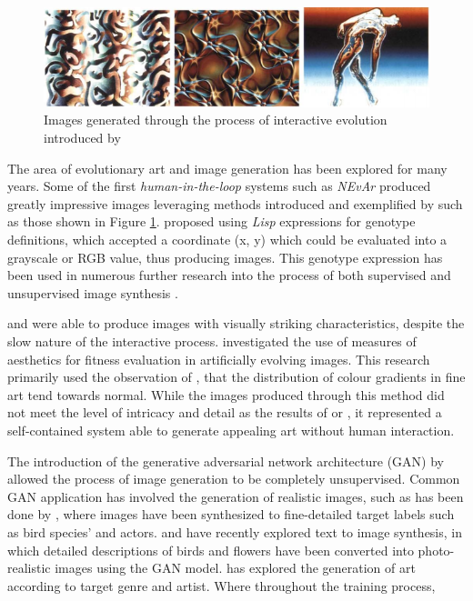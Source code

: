 \documentclass{article}
\begin{document}
	\begin{figure}[h!]
		\includegraphics[width=\textwidth]{images/sims-interactive-image-generation.png}
		\caption{Images generated through the process of interactive evolution introduced by \citet{sims}}
		\label{fig:sims}
	\end{figure}
	
	The area of evolutionary art and image generation has been explored for many years.
	Some of the first \textit{human-in-the-loop} systems such as \textit{NEvAr} \citep{nevar} produced greatly impressive images leveraging methods introduced and exemplified by \citet{sims} such as those shown in Figure \ref{fig:sims}.
	\citet{sims} proposed using \textit{Lisp} expressions for genotype definitions, which accepted a coordinate (x, y) which could be evaluated into a grayscale or RGB value, thus producing images.
	This genotype expression has been used in numerous further research into the process of both supervised and unsupervised image synthesis \citep{nevar, sims, den2011evolving, distributed-evolutionary-art, aesthetic-measures}.
	
	\citet{sims} and \citet{nevar} were able to produce images with visually striking characteristics, despite the slow nature of the interactive process.
	\citet{aesthetic-measures} investigated the use of measures of aesthetics for fitness evaluation in artificially evolving images.
	This research primarily used the observation of \citet{ralph-bell-curve}, that the distribution of colour gradients in fine art tend towards normal.
	While the images produced through this method did not meet the level of intricacy and detail as the results of \citet{sims} or \citet{nevar}, it represented a self-contained system able to generate appealing art without human interaction.
	
	The introduction of the generative adversarial network architecture (GAN) by \citet{GAN} allowed the process of image generation to be completely unsupervised.
	Common GAN application has involved the generation of realistic images, such as has been done by \citet{bao2017cvae}, where images have been synthesized to fine-detailed target labels such as bird species' and actors.
	\citet{zhang2017stackgan} and \citet{reed2016generative} have recently explored text to image synthesis, in which detailed descriptions of birds and flowers have been converted into photo-realistic images using the GAN model.
	\citet{tan2017artgan} has explored the generation of art according to target genre and artist.
	Where throughout the training process,
	
\end{document}
